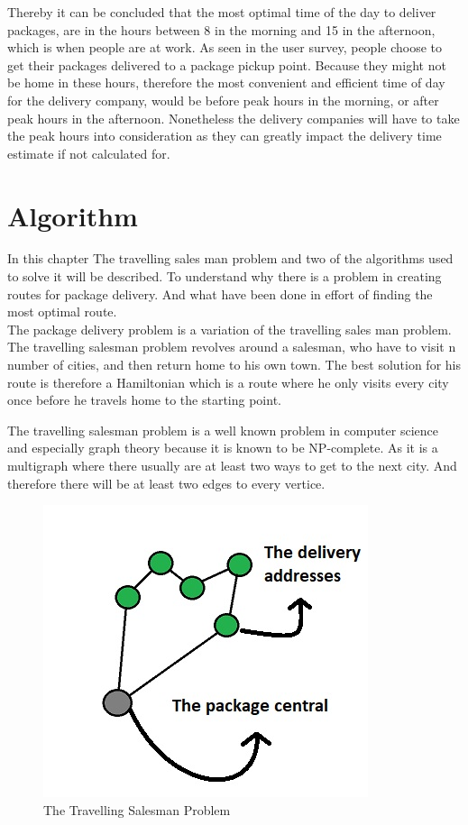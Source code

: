 \documentclass[12pt]{report}
\begin{document}
Thereby it can be concluded that the most optimal time of the day to deliver packages, are in the hours between 8 in the morning and 15 in the afternoon, which is when people are at work. As seen in the user survey, people choose to get their packages delivered to a package pickup point. Because they might not be home in these hours, therefore the most convenient and efficient time of day for the delivery company, would be before peak hours in the morning, or after peak hours in the afternoon. Nonetheless the delivery companies will have to take the peak hours into consideration as they can greatly impact the delivery time estimate if not calculated for.\\

\section{Algorithm}

In this chapter The travelling sales man problem and two of the algorithms used to solve it will be described. To understand why there is a problem in creating routes for package delivery. And what have been done in effort of finding the most optimal route.\\ 

The package delivery problem is a variation of the travelling sales man problem. The travelling salesman problem revolves around a salesman, who have to visit n number of cities, and then return home to his own town. The best solution for his route is therefore a Hamiltonian which is a route where he only visits every city once before he travels home to the starting point.\hspace*{5mm}

The travelling salesman problem is a well known problem in computer science and especially graph theory because it is known to be NP-complete. As it is a multigraph where there usually are at least two ways to get to the next city. And therefore there will be at least two edges to every vertice\cite{tsp}.

\begin{figure}[H]
  \centering
  \includegraphics[width=300 pt]{pics/tsp.jpg}
  \caption{The Travelling Salesman Problem}
  \label{fig: The Travelling Salesman Problem}
\end{figure}\textbf{}
\end{document}
